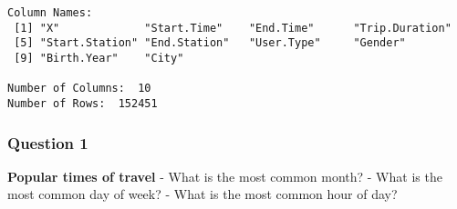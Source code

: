 \documentclass[11pt]{article}
\begin{document}
    \begin{Verbatim}[commandchars=\\\{\}]
Column Names:
 [1] "X"             "Start.Time"    "End.Time"      "Trip.Duration"
 [5] "Start.Station" "End.Station"   "User.Type"     "Gender"       
 [9] "Birth.Year"    "City"         

Number of Columns:  10
Number of Rows:  152451 

    \end{Verbatim}

    \hypertarget{question-1}{%
\subsubsection{Question 1}\label{question-1}}

\textbf{Popular times of travel} - What is the most common month? - What
is the most common day of week? - What is the most common hour of day?
\end{document}
